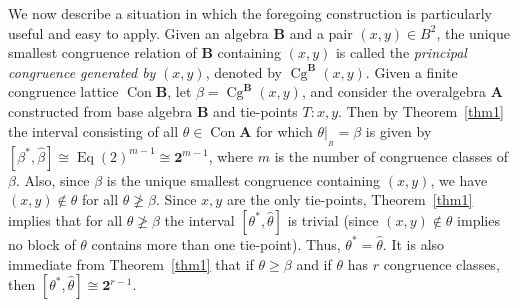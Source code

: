 \documentclass{au}
\numberwithin{equation}{section}
\theoremstyle{plain}
\theoremstyle{definition}
\newcommand{\<}{\ensuremath{\langle}}
\renewcommand{\>}{\ensuremath{\rangle}}
\newcommand{\bA}{\ensuremath{\mathbf{A}}}
\newcommand{\bB}{\ensuremath{\mathbf{B}}}
\DeclareMathOperator{\Eq}{Eq}
\DeclareMathOperator{\Cg}{Cg}
\DeclareMathOperator{\Con}{Con}
\renewcommand{\geq}{\ensuremath{\geqslant}}
\newcommand{\resB}{\ensuremath{|_{_B}}}
\newcommand{\two}{\ensuremath{\mathbf{2}}}
\begin{document}
We now describe a situation in which the foregoing construction is particularly
useful and easy to apply.
Given an algebra $\bB$ and a pair $(x,y) \in B^2$, the unique smallest congruence
relation of $\bB$ containing $(x,y)$ is called the \emph{principal
  congruence generated by} $(x,y)$, denoted by $\Cg^\bB(x,y)$.
Given a finite congruence lattice  $\Con\bB$, let $\beta = \Cg^\bB(x,y)$, and
consider the overalgebra $\bA$ constructed from  base algebra $\bB$ and
tie-points $T : x,y$.  Then by Theorem~\ref{thm1} the interval consisting of all
$\theta \in \Con\bA$ for which $\theta\resB = \beta$ is given by
$[\beta^*,\widehat{\beta}] \cong \Eq(2)^{m-1} \cong \two^{m-1}$, where $m$ is
the number of congruence classes of $\beta$. Also, since $\beta$ is the unique
smallest congruence containing $(x,y)$, we have  $(x,y)\notin \theta$ for all
$\theta \ngeq \beta$.
Since $x, y$ are the only tie-points, Theorem~\ref{thm1}
implies that for all $\theta \ngeq \beta$ the interval
$[\theta^*,\widehat{\theta}]$ is trivial (since $(x,y)\notin \theta$ implies no
block of $\theta$ contains more than one tie-point). Thus,
$\theta^*=\widehat{\theta}$. It is also immediate from Theorem~\ref{thm1} that
if $\theta \geq \beta$ and if $\theta$ has $r$ congruence
classes, then $[\theta^*,\widehat{\theta}] \cong \two^{r-1}$.
\end{document}
